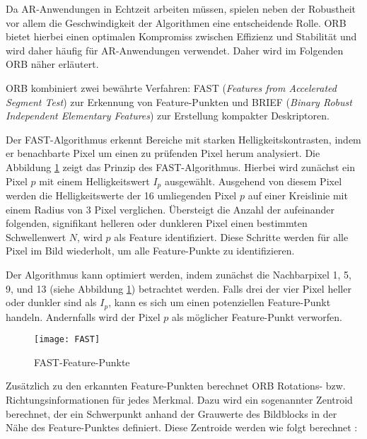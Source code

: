 Da AR-Anwendungen in Echtzeit arbeiten müssen, spielen neben der Robustheit vor allem die Geschwindigkeit der Algorithmen eine entscheidende Rolle. ORB bietet hierbei einen optimalen Kompromiss zwischen Effizienz und Stabilität und wird daher häufig für AR-Anwendungen verwendet. Daher wird im Folgenden ORB näher erläutert. \cite{gao2021vSLAM, rublee2011orb}

ORB kombiniert zwei bewährte Verfahren: FAST (\emph{Features from Accelerated Segment Test}) zur Erkennung von Feature-Punkten und BRIEF (\emph{Binary Robust Independent Elementary Features}) zur Erstellung kompakter Deskriptoren. \cite{gao2021vSLAM, rublee2011orb}

Der FAST-Algorithmus erkennt Bereiche mit starken Helligkeitskontrasten, indem er benachbarte Pixel um einen zu prüfenden Pixel herum analysiert. Die Abbildung \ref{fig:FAST} zeigt das Prinzip des FAST-Algorithmus. Hierbei wird zunächst ein Pixel \( p \) mit einem Helligkeitswert \( I_p \) ausgewählt. Ausgehend von diesem Pixel werden die Helligkeitswerte der 16 umliegenden Pixel \( p \) auf einer Kreislinie mit einem Radius von 3 Pixel verglichen. Übersteigt die Anzahl der aufeinander folgenden, signifikant helleren oder dunkleren Pixel einen bestimmten Schwellenwert \( N \), wird \( p \) als Feature identifiziert. Diese Schritte werden für alle Pixel im Bild wiederholt, um alle Feature-Punkte zu identifizieren. 

Der Algorithmus kann optimiert werden, indem zunächst die Nachbarpixel 1, 5, 9, und 13 (siehe Abbildung \ref{fig:FAST}) betrachtet werden. Falls drei der vier Pixel heller oder dunkler sind als \( I_p \), kann es sich um einen potenziellen Feature-Punkt handeln. Andernfalls wird der Pixel \( p \) als möglicher Feature-Punkt verworfen. \cite{gao2021vSLAM, rublee2011orb, rosten2006fast}

\begin{figure}
    \centering
    \texttt{[image: FAST]}
    \caption{FAST-Feature-Punkte \cite{rosten2006fast}\label{fig:FAST}}\par
\end{figure}

Zusätzlich zu den erkannten Feature-Punkten berechnet ORB Rotations- bzw. Richtungsinformationen für jedes Merkmal. Dazu wird ein sogenannter Zentroid berechnet, der ein Schwerpunkt anhand der Grauwerte des Bildblocks in der Nähe des Feature-Punktes definiert. Diese Zentroide werden wie folgt berechnet \cite{gao2021vSLAM, rublee2011orb}:

